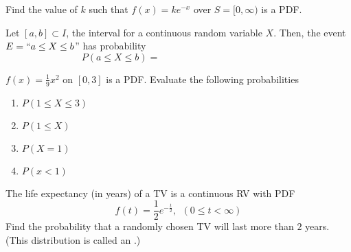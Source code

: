 \documentclass[12pt, a4paper]{article}
\begin{document}
\vspace{-2in}
\begin{ex}
  Find the value of \(k\) such that \(f(x) = k e^{-x}\) over \(S =
  [0,\infty)\) is a PDF.
\end{ex}
\begin{defi}
  Let \([a,b] \subset I\), the interval for a continuous random
  variable \(X\). Then, the event \(E = ``a \leq X \leq b\)''
  has probability \[
    P(a \leq X \leq b) = \hspace{2in}
  \]
\end{defi}
\begin{ex}
  \(f(x) = \frac{1}{9} x^2\) on \([0,3]\) is a PDF. Evaluate the
  following probabilities
  \begin{enumerate}
  \item \(P(1 \leq X \leq 3)\)
  \item \(P(1 \leq X)\)
  \item \(P(X=1)\)
  \item \(P(x < 1)\)
  \end{enumerate}
\end{ex}
\vspace{-2.4in}
\begin{ex}
  The life expectancy (in years) of a TV is a continuous RV with
  PDF \[
    f(t) = \frac{1}{2}e^{-\frac{t}{2}}, \ \ (0 \leq t < \infty)
  \]
  Find the probability that a randomly chosen TV will last more than
  \(2\) years. (This distribution is called an .)
\end{ex}
\end{document}
